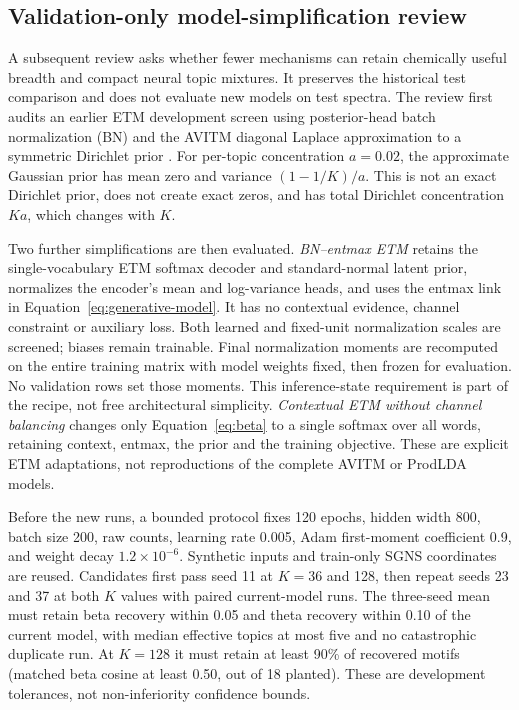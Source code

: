\documentclass[10pt,a4paper]{article}
\begin{document}
\subsection{Validation-only model-simplification review}
\label{sec:simplification-protocol}

A subsequent review asks whether fewer mechanisms can retain chemically
useful breadth and compact neural topic mixtures. It preserves the historical
test comparison and does not evaluate new models on test spectra. The review
first audits an earlier ETM development screen using posterior-head batch
normalization (BN) and the AVITM diagonal Laplace approximation to a symmetric
Dirichlet prior \cite{srivastava2017}. For per-topic concentration $a=0.02$,
the approximate Gaussian prior has mean zero and variance $(1-1/K)/a$.
This is not an exact Dirichlet prior, does not create exact zeros, and has
total Dirichlet concentration $Ka$, which changes with $K$.

Two further simplifications are then evaluated. \emph{BN--entmax ETM} retains
the single-vocabulary ETM softmax decoder and standard-normal latent prior,
normalizes the encoder's mean and log-variance heads, and uses the entmax link
in Equation~\ref{eq:generative-model}. It has no contextual evidence, channel
constraint or auxiliary loss. Both learned and fixed-unit normalization
scales are screened; biases remain trainable. Final normalization moments are
recomputed on the entire training matrix with model weights fixed, then frozen
for evaluation. No validation rows set those moments. This inference-state
requirement is part of the recipe, not free architectural simplicity.
\emph{Contextual ETM without channel balancing} changes only
Equation~\ref{eq:beta} to a single softmax over all words, retaining context,
entmax, the prior and the training objective. These are explicit ETM
adaptations, not reproductions of the complete AVITM or ProdLDA models.

Before the new runs, a bounded protocol fixes 120 epochs, hidden width 800,
batch size 200, raw counts, learning rate 0.005, Adam first-moment coefficient
0.9, and weight decay $1.2\times10^{-6}$. Synthetic inputs and train-only
SGNS coordinates are reused. Candidates first pass seed 11 at $K=36$ and 128,
then repeat seeds 23 and 37 at both $K$ values with paired current-model runs.
The three-seed mean must retain beta recovery within 0.05 and theta recovery
within 0.10 of the current model, with median effective topics at most five
and no catastrophic duplicate run. At $K=128$ it must retain at least 90\%
of recovered motifs (matched beta cosine at least 0.50, out of 18 planted).
These are development tolerances, not non-inferiority confidence bounds.
\end{document}
